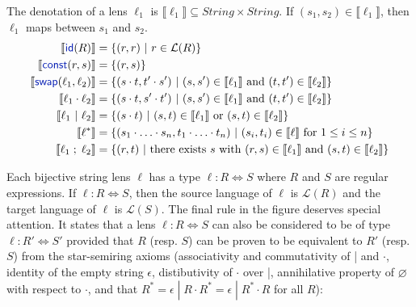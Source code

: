 \documentclass[acmsmall,screen]{acmart}
\newcommand{\kw}[1]{\textcolor{dkblue}{\ensuremath{\mathsf{#1}}}}
\newcommand{\sep}{\ensuremath{\ | \ }}
\newcommand{\const}{\ensuremath{\kw{const}}}
\newcommand{\swap}{\ensuremath{\kw{swap}}}
\newcommand{\id}{\ensuremath{\kw{id}}}
\begin{document}
The denotation of a lens $\ell_1$ is $\llbracket \ell_1 \rrbracket \subseteq
\mathit{String} \times \mathit{String}$. If $(s_1, s_2) \in \llbracket \ell_1
\rrbracket$, then $\ell_1$ maps between $s_1$ and $s_2$.
\begin{align*}
\llbracket \id(R) \rrbracket &= \{(r, r) \sep r \in \mathcal{L}(R)\}\\
\llbracket \const(r, s) \rrbracket &= \{(r, s)\}\\
\llbracket \swap(\ell_1, \ell_2) \rrbracket &= \{(s \cdot t, t' \cdot s') \sep
(s, s') \in \llbracket \ell_1 \rrbracket \text{ and } (t, t') \in \llbracket
\ell_2 \rrbracket\}\\
\llbracket \ell_1 \cdot \ell_2 \rrbracket &= \{(s \cdot t, s' \cdot t') \sep
(s, s') \in \llbracket \ell_1 \rrbracket \text{ and } (t, t') \in \llbracket
\ell_2 \rrbracket\}\\
\llbracket \ell_1 \sep \ell_2 \rrbracket &= \{(s \cdot t) \sep
(s, t) \in \llbracket \ell_1 \rrbracket \text{ or } (s, t) \in \llbracket
\ell_2 \rrbracket\}\\
\llbracket \ell^* \rrbracket &= \{(s_1 \cdot \ldots \cdot s_n, t_1 \cdot \ldots
\cdot t_n) \sep (s_i, t_i) \in \llbracket \ell \rrbracket \text{ for } 1
\leq i \leq n\}\\
\llbracket \ell_1 \; ; \; \ell_2 \rrbracket &= \{(r, t) \sep \text{there exists }s
\text{ with } (r, s) \in \llbracket \ell_1 \rrbracket \text{ and } (s, t)
\in \llbracket \ell_2 \rrbracket\}
\end{align*}

Each bijective string lens $\ell$ has a type $\ell : R \Leftrightarrow S$ where
$R$ and $S$ are regular expressions. If $\ell : R \Leftrightarrow S$, then the
source language of $\ell$ is $\mathcal{L}(R)$ and the target language of $\ell$
is $\mathcal{L}(S)$. The final rule in the figure deserves special attention.
It states that a lens $\ell : R \Leftrightarrow S$ can also be considered to be
of type $\ell : R' \Leftrightarrow S'$ provided that $R$ (resp. $S$) can be
proven to be equivalent to $R'$ (resp. $S$) from the star-semiring axioms
(associativity and commutativity of | and $\cdot$, identity of the empty string
$\epsilon$, distibutivity of $\cdot$ over |, annihilative property of
$\varnothing$ with respect to $\cdot$, and that $R^* = \epsilon \; | \; R \cdot
R^* = \epsilon \; | \; R^* \cdot R$ for all $R$):

\begin{prooftree}
\end{prooftree}
\end{document}
